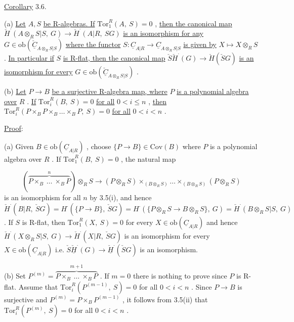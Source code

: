\underline{Corollary} 3.6.

(a)  \underline{Let}  $A, S$  \underline{be R-algebras. If}  $\mathrm{Tor}^R_1(A,\ S) = 0$  , \underline{then the canonical map}  $\check{H}^{\cdot}(A\otimes_R S|S,\ G) \to \check{H}^{\cdot}(A|R,\ SG)$  \underline{is an isomorphism for any}  $G \in \mathrm{ob}(\check{\underline{C}}_{A\otimes_R S|S})$  \underline{where the functor}  $S : \underline{C}_{A|R} \to \underline{C}_{A\otimes_R S|S}$  \underline{is given by}  $X \longmapsto X\otimes_R S$  . \underline{In particular if}  $S$  \underline{is R-flat, then the canonical map}  $\check{S}\check{H}^{\cdot}(G) \to \check{H}(\check{S}G)$  \underline{is an isomorphism for every}  $G \in \mathrm{ob}(\check{\underline{C}}_{A\otimes_R S|S})$  .

(b)  \underline{Let}  $P \to B$  \underline{be a surjective R-algebra map, where}  $P$  \underline{is a polynomial algebra over}  $R$  . \underline{If}  $\mathrm{Tor}^R_i(B,\ S) = 0$  \underline{for all}  $0 < i \leq n$  , \underline{then} $\mathrm{Tor}^R_i(P\times_B P\times_B \ldots \times_B P,\ S) = 0$  \underline{for all}  $0 < i < n$  .


\underline{Proof}:

(a)  Given  $B \in \mathrm{ob}(\underline{C}_{A|R})$  , choose  $\{P \to B\} \in \mathrm{Cov}(B)$  where  $P$  is a polynomial algebra over  $R$  . If  $\mathrm{Tor}^R_1(B,\ S) = 0$  , the natural map

\begin{equation*}
(\overbrace{P\times_B \ \ldots\ \times_B P}^{\,n\,})\otimes_R S \to (P\otimes_R S)\times_{(B\otimes_R S)} \ldots \times_{(B\otimes_R S)} (P\otimes_R S)
\end{equation*}
is an isomorphism for all  $n$  by 3.5(i), and hence  $\check{H}^{\cdot}(B|R,\ \check{S}G) = H^{\cdot}(\{P \to B\},\ \check{S}G) = H^{\cdot}(\{P\otimes_R S \to B\otimes_R S\},\ G) = \check{H}^{\cdot}(B\otimes_R S|S,\ G)$  . If  $S$  is R-flat, then  $\mathrm{Tor}^R_1(X,\ S) = 0$  for every  $X \in \mathrm{ob}(\underline{C}_{A|R})$  and hence $\check{H}^{\cdot}(X\otimes_R S|S,\ G) \to \check{H}^{\cdot}(X|R,\ \check{S}G)$  is an isomorphism for every  $X \in \mathrm{ob}(\underline{C}_{A|R})$  i.e. $\check{S}\underline{\check{H}}^{\cdot}(G) \to \underline{\check{H}}^{\cdot}(\check{S}G)$  is an isomorphism.

(b)  Set  $P^{(m)} = \overbrace{P\times_B \ \ldots\ \times_B P}^{\,m+1\,}$  . If  $m = 0$  there is nothing to prove since  $P$  is R-flat. Assume that  $\mathrm{Tor}^R_i(P^{(m-1)},\ S) = 0$  for all  $0 < i < n$  . Since  $P \to B$  is surjective and  $P^{(m)} = P\times_B P^{(m-1)}$  , it follows from 3.5(ii) that $\mathrm{Tor}^R_i(P^{(m)},\ S) = 0$  for all  $0 < i < n$  .




